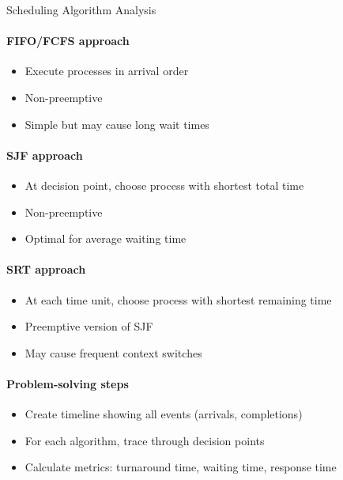 \begin{KR}{Scheduling Algorithm Analysis}
    \paragraph{FIFO/FCFS approach}
    \begin{itemize}
        \item Execute processes in arrival order
        \item Non-preemptive
        \item Simple but may cause long wait times
    \end{itemize}
    
    \paragraph{SJF approach}
    \begin{itemize}
        \item At decision point, choose process with shortest total time
        \item Non-preemptive
        \item Optimal for average waiting time
    \end{itemize}
    
    \paragraph{SRT approach}
    \begin{itemize}
        \item At each time unit, choose process with shortest remaining time
        \item Preemptive version of SJF
        \item May cause frequent context switches
    \end{itemize}
    
    \paragraph{Problem-solving steps}
    \begin{itemize}
        \item Create timeline showing all events (arrivals, completions)
        \item For each algorithm, trace through decision points
        \item Calculate metrics: turnaround time, waiting time, response time
    \end{itemize}
\end{KR}

